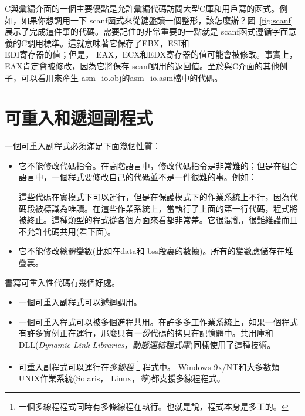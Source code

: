 C與彙編介面的一個主要優點是允許彙編代碼訪問大型C庫和用戶寫的函式。例如，如果你想調用一下{\code
scanf}函式來從鍵盤讀一個整形，該怎麼辦？圖~\ref{fig:scanf}展示了完成這件事的代碼。需要記住的非常重要的一點就是{\code
scanf}函式遵循字面意義的C調用標準。這就意味著它保存了EBX，ESI和\\EDI寄存器的值；但是，
EAX，ECX和EDX寄存器的值可能會被修改。事實上，EAX肯定會被修改，因為它將保存{\code
scanf}調用的返回值。至於與C介面的其他例子，可以看用來產生{\code
asm\_io.obj}的{\code asm\_io.asm}檔中的代碼。 

\section{可重入和遞迴副程式}

一個可重入副程式必須滿足下面幾個性質：
\begin{itemize}
\item 它不能修改代碼指令。在高階語言中，修改代碼指令是非常難的；但是在組合語言中，一個程式要修改自己的代碼並不是一件很難的事。例如：
這些代碼在實模式下可以運行，但是在保護模式下的作業系統上不行，因為代碼段被標識為唯讀。在這些作業系統上，當執行了上面的第一行代碼，程式將被終止。這種類型的程式從各個方面來看都非常差。它很混亂，很難維護而且不允許代碼共用(看下面)。

\item 它不能修改總體變數(比如在{\code data}和
{\code bss}段裏的數據)。所有的變數應儲存在堆疊裏。

\end{itemize}

書寫可重入性代碼有幾個好處。
\begin{itemize}
\item 一個可重入副程式可以遞迴調用。
\item 一個可重入程式可以被多個進程共用。在許多多工作業系統上，如果一個程式有許多實例正在運行，那麼只有\emph{一份}代碼的拷貝在記憶體中。共用庫和DLL(\emph{Dynamic Link Libraries，動態連結程式庫})同樣使用了這種技術。
\item 可重入副程式可以運行在\emph{多線程}
\footnote{一個多線程程式同時有多條線程在執行。也就是說，程式本身是多工的。} 程式中。 Windows 9x/NT和大多數類
UNIX作業系統(Solaris， Linux，\emph{等})都支援多線程程式。
\end{itemize}

